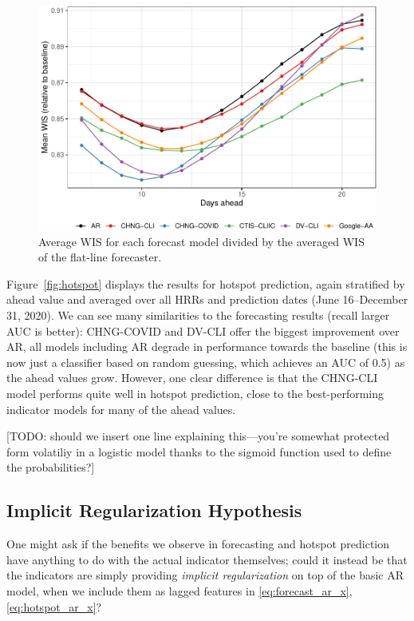 \documentclass[9pt,twocolumn,twoside,lineno]{pnas-new}
\begin{document}
\begin{figure}[t]
  \includegraphics[width=\columnwidth]{fig/fcast-1.pdf}
  \caption{Average WIS for each forecast model divided by the averaged WIS of
    the flat-line forecaster.}
  \label{fig:forecast}
\end{figure}

Figure~\ref{fig:hotspot} displays the results for hotspot prediction, again
stratified by ahead value and averaged over all HRRs and prediction dates (June 
16--December 31, 2020).  We can see many similarities to the forecasting
results (recall larger AUC is better): CHNG-COVID and DV-CLI offer the biggest
improvement over AR, all models including AR degrade in performance towards the
baseline (this is now just a classifier based on random guessing, which achieves
an AUC of 0.5) as the ahead values grow.  However, one clear difference is that
the CHNG-CLI model performs quite well in hotspot prediction, close to the
best-performing indicator models for many of the ahead values. 

[TODO: should we
insert one line explaining this---you're somewhat protected form volatiliy in a
logistic model thanks to 
the sigmoid function used to define the probabilities?]  

\subsection{Implicit Regularization Hypothesis}

One might ask if the benefits we observe in forecasting and hotspot
prediction have
anything to do with the actual indicator themselves; could it instead be that
the indicators are simply providing \textit{implicit regularization} on top of 
the basic AR model, when we include them as lagged features in
\eqref{eq:forecast_ar_x}, \eqref{eq:hotspot_ar_x}?  
\end{document}
